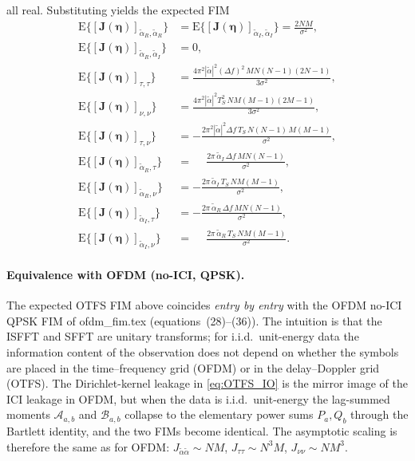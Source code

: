 \documentclass[11pt]{article}
\begin{document}
all real. Substituting yields the expected FIM
\begin{align}
    \mathrm{E}\{[\bm{J}(\bm{\eta})]_{\tilde{\alpha}_R, \tilde{\alpha}_R}\} &=
        \mathrm{E}\{[\bm{J}(\bm{\eta})]_{\tilde{\alpha}_I, \tilde{\alpha}_I}\} =
        \tfrac{2 N M}{\sigma^2}, \\
    \mathrm{E}\{[\bm{J}(\bm{\eta})]_{\tilde{\alpha}_R, \tilde{\alpha}_I}\} &= 0, \\
    \mathrm{E}\{[\bm{J}(\bm{\eta})]_{\tau,\tau}\} &=
        \tfrac{4\pi^2 |\tilde{\alpha}|^2 (\Delta f)^2\, M N(N-1)(2N-1)}{3\sigma^2}, \\
    \mathrm{E}\{[\bm{J}(\bm{\eta})]_{\nu,\nu}\} &=
        \tfrac{4\pi^2 |\tilde{\alpha}|^2 T_S^2\, N M(M-1)(2M-1)}{3\sigma^2}, \\
    \mathrm{E}\{[\bm{J}(\bm{\eta})]_{\tau,\nu}\} &=
        -\tfrac{2\pi^2 |\tilde{\alpha}|^2 \Delta f\, T_S\, N(N-1)\, M(M-1)}{\sigma^2}, \\
    \mathrm{E}\{[\bm{J}(\bm{\eta})]_{\tilde{\alpha}_R, \tau}\} &=
        \phantom{-}\tfrac{2\pi\,\tilde{\alpha}_I\,\Delta f\, M N(N-1)}{\sigma^2}, \\
    \mathrm{E}\{[\bm{J}(\bm{\eta})]_{\tilde{\alpha}_R, \nu}\} &=
        -\tfrac{2\pi\,\tilde{\alpha}_I\, T_S\, N M(M-1)}{\sigma^2}, \\
    \mathrm{E}\{[\bm{J}(\bm{\eta})]_{\tilde{\alpha}_I, \tau}\} &=
        -\tfrac{2\pi\,\tilde{\alpha}_R\,\Delta f\, M N(N-1)}{\sigma^2}, \\
    \mathrm{E}\{[\bm{J}(\bm{\eta})]_{\tilde{\alpha}_I, \nu}\} &=
        \phantom{-}\tfrac{2\pi\,\tilde{\alpha}_R\, T_S\, N M(M-1)}{\sigma^2}.
\end{align}

\paragraph{Equivalence with OFDM (no-ICI, QPSK).} The expected OTFS FIM
above coincides \emph{entry by entry} with the OFDM no-ICI QPSK FIM of
ofdm\_fim.tex (equations~(28)--(36)). The intuition is that the ISFFT
and SFFT are unitary transforms; for i.i.d.\ unit-energy data the
information content of the observation does not depend on whether the
symbols are placed in the time--frequency grid (OFDM) or in the
delay--Doppler grid (OTFS). The Dirichlet-kernel leakage in
\eqref{eq:OTFS_IO} is the mirror image of the ICI leakage in OFDM, but
when the data is i.i.d.\ unit-energy the lag-summed moments
\(\mathcal{A}_{a,b}\) and \(\mathcal{B}_{a,b}\) collapse to the
elementary power sums \(P_a, Q_b\) through the Bartlett identity, and
the two FIMs become identical. The asymptotic scaling is therefore the
same as for OFDM: \(J_{\tilde{\alpha}\tilde{\alpha}}\sim NM\),
\(J_{\tau\tau}\sim N^3 M\), \(J_{\nu\nu}\sim NM^3\).
\end{document}
